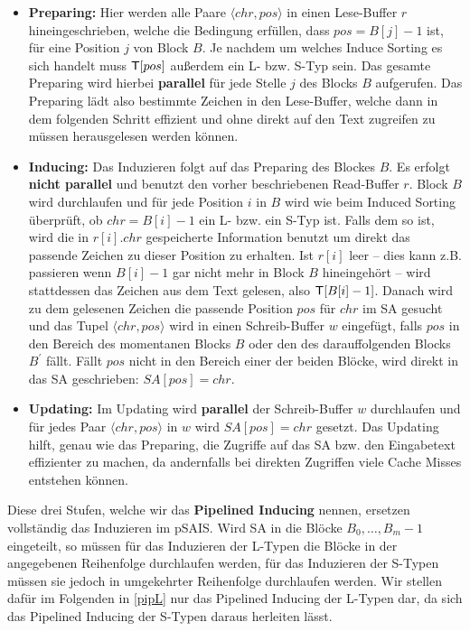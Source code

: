 \begin{itemize}
\item \textbf{Preparing:} Hier werden alle Paare $\langle chr, pos \rangle$ in einen Lese-Buffer $r$ hineingeschrieben, welche die Bedingung erfüllen, dass $pos = B[j]-1$ ist, für eine Position $j$ von Block $B$. Je nachdem um welches Induce Sorting es sich handelt muss $\inputtext[pos]$ außerdem ein L- bzw. S-Typ sein. Das gesamte Preparing wird hierbei \textbf{parallel} für jede Stelle $j$ des Blocks $B$ aufgerufen. Das Preparing lädt also bestimmte Zeichen in den Lese-Buffer, welche dann in dem folgenden Schritt effizient und ohne direkt auf den Text zugreifen zu müssen herausgelesen werden können.

\item \textbf{Inducing:} Das Induzieren folgt auf das Preparing des Blockes $B$. Es erfolgt \textbf{nicht parallel} und benutzt den vorher beschriebenen Read-Buffer $r$. Block $B$ wird durchlaufen und für jede Position $i$ in $B$ wird wie beim Induced Sorting überprüft, ob $chr = B[i]-1$ ein L- bzw. ein S-Typ ist. Falls dem so ist, wird die in $r[i].chr$ gespeicherte Information benutzt um direkt das passende Zeichen zu dieser Position zu erhalten. Ist $r[i]$ leer -- dies kann z.B. passieren wenn $B[i]-1$ gar nicht mehr in Block $B$ hineingehört -- wird stattdessen das Zeichen aus dem Text gelesen, also $\inputtext[B[i]-1]$. Danach wird zu dem gelesenen Zeichen die passende Position $pos$ für $chr$ im SA gesucht und das Tupel $\langle chr, pos \rangle$ wird in einen Schreib-Buffer $w$ eingefügt, falls $pos$ in den Bereich des momentanen Blocks $B$ oder den des darauffolgenden Blocks $B^\prime$ fällt. Fällt $pos$ nicht in den Bereich einer der beiden Blöcke, wird direkt in das SA geschrieben: $SA[pos] = chr$.

\item \textbf{Updating:} Im Updating wird \textbf{parallel} der Schreib-Buffer $w$ durchlaufen und für jedes Paar $\langle chr, pos \rangle$ in $w$ wird $SA[pos] = chr$ gesetzt. Das Updating hilft, genau wie das Preparing, die Zugriffe auf das SA bzw. den Eingabetext effizienter zu machen, da andernfalls bei direkten Zugriffen viele Cache Misses entstehen können.
\end{itemize}

Diese drei Stufen, welche wir das \textbf{Pipelined Inducing} nennen, ersetzen vollständig das Induzieren im pSAIS. Wird SA in die Blöcke $B_0, \ldots, B_m-1$ eingeteilt, so müssen für das Induzieren der L-Typen die Blöcke in der angegebenen Reihenfolge durchlaufen werden, für das Induzieren der S-Typen müssen sie jedoch in umgekehrter Reihenfolge durchlaufen werden. Wir stellen dafür im Folgenden in \ref{pipL} nur das Pipelined Inducing der L-Typen dar, da sich das Pipelined Inducing der S-Typen daraus herleiten lässt.

